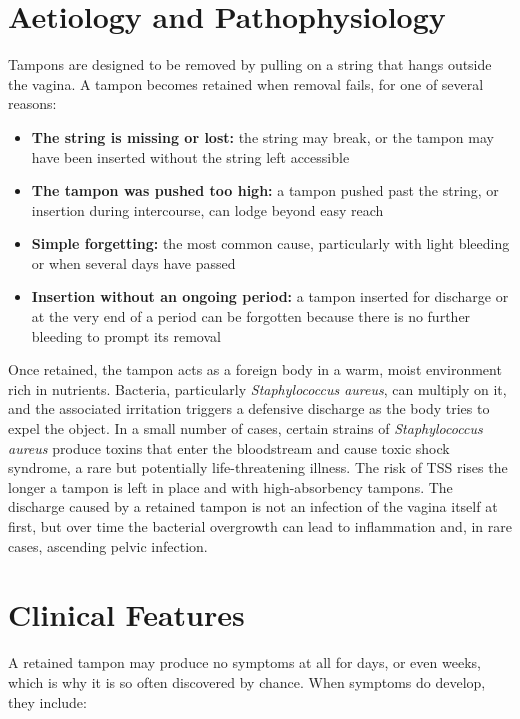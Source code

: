 \section*{Aetiology and Pathophysiology}
Tampons are designed to be removed by pulling on a string that hangs outside the vagina. A tampon becomes retained when removal fails, for one of several reasons:

\begin{itemize}
    \item \textbf{The string is missing or lost:} the string may break, or the tampon may have been inserted without the string left accessible
    \item \textbf{The tampon was pushed too high:} a tampon pushed past the string, or insertion during intercourse, can lodge beyond easy reach
    \item \textbf{Simple forgetting:} the most common cause, particularly with light bleeding or when several days have passed
    \item \textbf{Insertion without an ongoing period:} a tampon inserted for discharge or at the very end of a period can be forgotten because there is no further bleeding to prompt its removal
\end{itemize}

Once retained, the tampon acts as a foreign body in a warm, moist environment rich in nutrients. Bacteria, particularly \textit{Staphylococcus aureus}, can multiply on it, and the associated irritation triggers a defensive discharge as the body tries to expel the object. In a small number of cases, certain strains of \textit{Staphylococcus aureus} produce toxins that enter the bloodstream and cause toxic shock syndrome, a rare but potentially life-threatening illness. The risk of TSS rises the longer a tampon is left in place and with high-absorbency tampons. The discharge caused by a retained tampon is not an infection of the vagina itself at first, but over time the bacterial overgrowth can lead to inflammation and, in rare cases, ascending pelvic infection.

\section*{Clinical Features}
A retained tampon may produce no symptoms at all for days, or even weeks, which is why it is so often discovered by chance. When symptoms do develop, they include:

